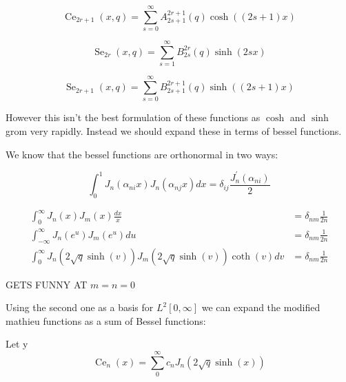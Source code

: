 \documentclass{article}
\DeclareMathOperator{\Ce}{Ce}
\DeclareMathOperator{\Se}{Se}
\begin{document}
\begin{equation}
    \Ce_{2r+1}(x, q) = \sum_{s=0}^{\infty}{A_{2s+1}^{2r+1}(q)\cosh((2s+1)x)}
\end{equation}

\begin{equation}
    \Se_{2r}(x, q) = \sum_{s=1}^{\infty}{B_{2s}^{2r}(q)\sinh(2sx)}
\end{equation}

\begin{equation}
    \Se_{2r+1}(x, q) = \sum_{s=0}^{\infty}{B_{2s+1}^{2r+1}(q)\sinh((2s+1)x)}
\end{equation}

However this isn't the best formulation of these functions as $\cosh$ and $\sinh$ grom very rapidly. Instead we should expand these in terms of bessel functions.

We know that the bessel functions are orthonormal in two ways:

\begin{equation}
    \int_0^1 J_n(\alpha_{ni}x) J_n(\alpha_{nj}x) dx = \delta_{ij} \frac{J^{\prime}_n(\alpha_{ni})}{2}
\end{equation}

\begin{align}
    \int_0^\infty J_n(x) J_m(x) \frac{dx}{x} & = \delta_{nm} \frac{1}{2n} \\
    \int_{-\infty}^\infty J_n(e^u) J_m(e^u) du & = \delta_{nm} \frac{1}{2n} \\
    \int_{0}^\infty J_n(2 \sqrt{q} \sinh(v)) J_m(2 \sqrt{q} \sinh(v)) \coth(v) dv & = \delta_{nm} \frac{1}{2n}
\end{align}

GETS FUNNY AT $m = n = 0$

Using the second one as a basis for $L^2[0,\infty]$ we can expand the modified mathieu functions as a sum of Bessel functions:

Let y 
\begin{equation}
    \Ce_{n}(x) = \sum_{0}^{\infty} c_n J_{n} \left(2 \sqrt{q} \sinh(x) \right)
\end{equation}
\end{document}
